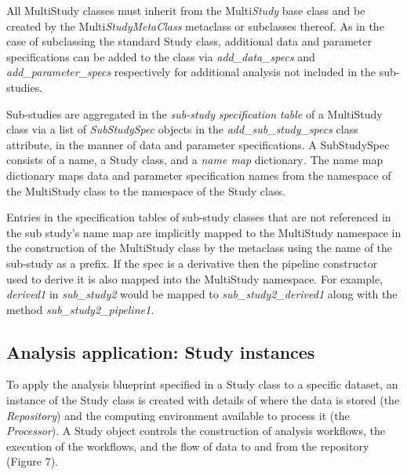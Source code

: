 All MultiStudy classes must inherit from the Multi\emph{Study} base
class and be created by the Multi\emph{StudyMetaClass} metaclass or
subclasses thereof. As in the case of subclassing the standard Study
class, additional data and parameter specifications can be added to the
class via \emph{add\_data\_specs} and \emph{add\_parameter\_specs}
respectively for additional analysis not included in the sub-studies.

Sub-studies are aggregated in the \emph{sub-study} \emph{specification
table} of a MultiStudy class via a list of \emph{SubStudySpec} objects
in the \emph{add\_sub\_study\_specs} class attribute, in the manner of
data and parameter specifications. A SubStudySpec consists of a name, a
Study class, and a \emph{name map} dictionary\emph{.} The name map
dictionary maps data and parameter specification names from the
namespace of the MultiStudy class to the namespace of the Study class.

Entries in the specification tables of sub-study classes that are not
referenced in the sub study's name map are implicitly mapped to the
MultiStudy namespace in the construction of the MultiStudy class by the
metaclass using the name of the sub-study as a prefix. If the spec is a
derivative then the pipeline constructor used to derive it is also
mapped into the MultiStudy namespace. For example, \emph{derived1} in
\emph{sub\_study2} would be mapped to \emph{sub\_study2\_derived1} along
with the method \emph{sub\_study2\_pipeline1}.

\hypertarget{analysis-application-study-instances}{%
\subsection{Analysis application: Study
instances}\label{analysis-application-study-instances}}

To apply the analysis blueprint specified in a Study class to a specific
dataset, an instance of the Study class is created with details of where
the data is stored (the \emph{Repository}) and the computing environment
available to process it (the \emph{Processor}). A Study object controls
the construction of analysis workflows, the execution of the workflows,
and the flow of data to and from the repository (Figure 7).

